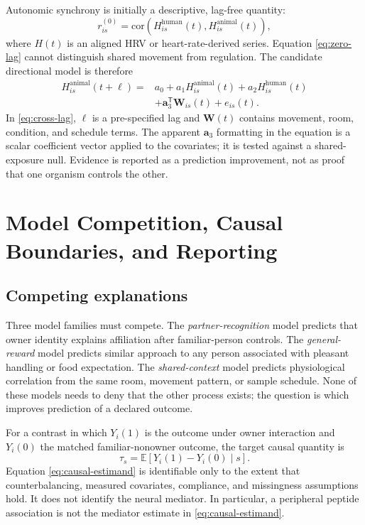\documentclass[conference]{IEEEtran}
\begin{document}
Autonomic synchrony is initially a descriptive, lag-free quantity:
\begin{equation}
r_{is}^{(0)}=\mathrm{cor}\left(H^{\mathrm{human}}_{is}(t),H^{\mathrm{animal}}_{is}(t)\right),
\label{eq:zero-lag}
\end{equation}
where $H(t)$ is an aligned HRV or heart-rate-derived series. Equation \eqref{eq:zero-lag} cannot distinguish shared movement from regulation. The candidate directional model is therefore
\begin{align}
H^{\mathrm{animal}}_{is}(t+\ell)={}&a_0+a_1H^{\mathrm{animal}}_{is}(t)+a_2H^{\mathrm{human}}_{is}(t)\nonumber\\
&+\mathbf{a}_{3}^{\mathsf{T}}\mathbf{W}_{is}(t)+e_{is}(t).
\label{eq:cross-lag}
\end{align}
In \eqref{eq:cross-lag}, $\ell$ is a pre-specified lag and $\mathbf{W}(t)$ contains movement, room, condition, and schedule terms. The apparent $\mathbf{a}_3$ formatting in the equation is a scalar coefficient vector applied to the covariates; it is tested against a shared-exposure null. Evidence is reported as a prediction improvement, not as proof that one organism controls the other.

\section{Model Competition, Causal Boundaries, and Reporting}

\subsection{Competing explanations}

Three model families must compete. The \emph{partner-recognition} model predicts that owner identity explains affiliation after familiar-person controls. The \emph{general-reward} model predicts similar approach to any person associated with pleasant handling or food expectation. The \emph{shared-context} model predicts physiological correlation from the same room, movement pattern, or sample schedule. None of these models needs to deny that the other process exists; the question is which improves prediction of a declared outcome.

For a contrast in which $Y_i(1)$ is the outcome under owner interaction and $Y_i(0)$ the matched familiar-nonowner outcome, the target causal quantity is
\begin{equation}
\tau_s=\mathbb{E}\left[Y_i(1)-Y_i(0)\mid s\right].
\label{eq:causal-estimand}
\end{equation}
Equation \eqref{eq:causal-estimand} is identifiable only to the extent that counterbalancing, measured covariates, compliance, and missingness assumptions hold. It does not identify the neural mediator. In particular, a peripheral peptide association is not the mediator estimate in \eqref{eq:causal-estimand}.
\end{document}
